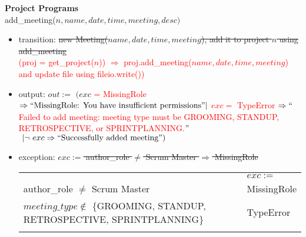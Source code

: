 \documentclass[12pt, titlepage]{article}
\begin{document}
\noindent \textbf{Project Programs\\}
\noindent add\_meeting($n, name, date, time, meeting, desc)$
\begin{itemize}
    \item transition: \sout{new Meeting($name, date, time, meeting$), add it to project $n$ using\\ add\_meeting}\\
    \textcolor{red}{(proj = get\_project($n$)) $\Rightarrow$ proj.add\_meeting($name, date, time, meeting$) and update file using fileio.write())}
    
    \item output: $out :=$ $(exc$ \textcolor{red}{= MissingRole} $\Rightarrow ``\text{MissingRole: You have insufficient permissions}"\\ |$ \textcolor{red}{$exc =$ TypeError $\Rightarrow ``$Failed to add meeting: meeting type must be GROOMING, STANDUP, RETROSPECTIVE, or SPRINTPLANNING.$"$}$\ |\ \\ \lnot\ exc \Rightarrow ``\text{Successfully added meeting}")$
    
    \item exception: \sout{$exc :=$ author\_role $\neq$ Scrum Master $\Rightarrow$ MissingRole}\\
    \textcolor{red}{
    \begin{tabular}{|p{12cm}|l|}
        \hhline{~|-|}
        \multicolumn{1}{r|}{} & \multicolumn{1}{l|}{$exc :=$}\\
        \hhline{|-|-|}
        author\_role $\neq$ Scrum Master & MissingRole\\
        \hhline{|-|-|}
        $meeting\_type \notin$ \{GROOMING, STANDUP, RETROSPECTIVE, SPRINTPLANNING\} & TypeError\\
        \hhline{|-|-|}
    \end{tabular}}
\end{itemize}
\end{document}
